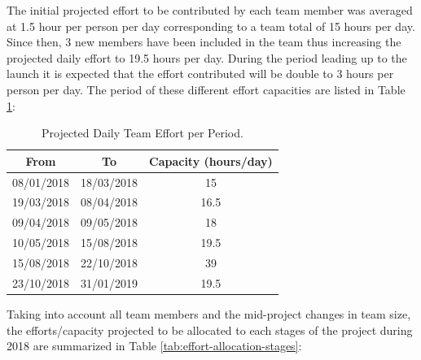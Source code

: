 \documentclass[a4paper,12pt,twoside]{article}
\begin{document}
The initial projected effort to be contributed by each team member was averaged at 1.5 hour per person per day corresponding to a team total of 15 hours per day. Since then, 3 new members have been included in the team thus increasing the projected daily effort to 19.5 hours per day. During the period leading up to the launch it is expected that the effort contributed will be double to 3 hours per person per day. The period of these different effort capacities are listed in Table \ref{tab:daily-team-effort-per-period}:

\begin{table}[H]
\centering
\begin{tabular}{|c|c|c|}
\hline
\textbf{From} & \textbf{To} & \textbf{Capacity (hours/day)} \\ \hline
08/01/2018 & 18/03/2018 & 15 \\ \hline
19/03/2018 & 08/04/2018 & 16.5 \\ \hline
09/04/2018 & 09/05/2018 & 18 \\ \hline
10/05/2018 & 15/08/2018 & 19.5 \\ \hline
15/08/2018 & 22/10/2018 & 39 \\ \hline
23/10/2018 & 31/01/2019 & 19.5 \\ \hline
\end{tabular}
\caption{Projected Daily Team Effort per Period.}
\label{tab:daily-team-effort-per-period}
\end{table}

Taking into account all team members and the mid-project changes in team size, the efforts/capacity projected to be allocated to each stages of the project during 2018 are summarized in Table \ref{tab:effort-allocation-stages}:
\end{document}
